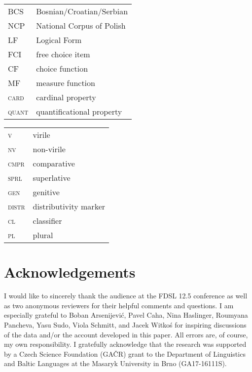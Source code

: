 \documentclass[output=paper,
]{langscibook}
\begin{document}
	\begin{tabularx}{.48\textwidth}{lQ}
		BCS&Bosnian/Croatian/Serbian\\
		NCP&National Corpus of Polish\\
		LF&Logical Form\\
		FCI&free choice item\\
		CF&choice function\\
		MF&measure function\\
		\textsc{card}&cardinal property\\
		\textsc{quant}&quantificational property\\
	\end{tabularx}
	\begin{tabularx}{.48\textwidth}{lQ}
		\textsc{v}&virile\\
		\textsc{nv}&non-virile\\
		\textsc{cmpr}&comparative\\
		\textsc{sprl}&superlative\\
		\textsc{gen}&genitive\\
		\textsc{distr}&distributivity marker\\
		\textsc{cl}&classifier\\
		\textsc{pl}&plural\\
	\end{tabularx}
	
	\section*{Acknowledgements}
    
	I would like to sincerely thank the audience at the FDSL 12.5 conference as well as two anonymous reviewers for their helpful comments and questions. I am especially grateful to Boban Arsenijević, Pavel Caha, Nina Haslinger, Roumyana Pancheva, Yasu Sudo, Viola Schmitt, and Jacek Witkoś for inspiring discussions of the data and/or the account developed in this paper. All errors are, of course, my own responsibility. I gratefully acknowledge that the research was supported by a Czech Science Foundation (GAČR) grant to the Department of Linguistics and Baltic Languages at the Masaryk University in Brno (GA17-16111S).

\sloppy
\printbibliography[heading=subbibliography,notkeyword=this]
	 
\end{document}
